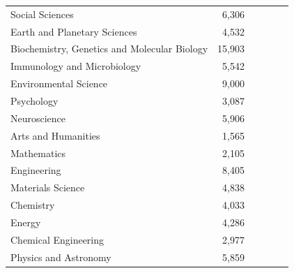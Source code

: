 \documentclass[a4paper,man,floatsintext,longtable,noextraspace,12pt]{apa6}
\begin{document}
\begin{table}[H]
{\begin{tabular}[t]{lrrrrr}
Social Sciences & 6,306 & \cellcolor[HTML]{F79273}{60} & \cellcolor[HTML]{F27F70}{36} & \cellcolor[HTML]{FFE8BB}{3} & \cellcolor[HTML]{FFFFFF}{0}\\
Earth and Planetary Sciences & 4,532 & \cellcolor[HTML]{F89874}{59} & \cellcolor[HTML]{F48671}{35} & \cellcolor[HTML]{FCD697}{5} & \cellcolor[HTML]{FFFFFF}{0}\\
Biochemistry, Genetics and Molecular Biology & 15,903 & \cellcolor[HTML]{F89874}{59} & \cellcolor[HTML]{F48671}{35} & \cellcolor[HTML]{FDE1A5}{4} & \cellcolor[HTML]{FAA476}{2}\\
Immunology and Microbiology & 5,542 & \cellcolor[HTML]{F89874}{59} & \cellcolor[HTML]{F58D72}{34} & \cellcolor[HTML]{FCC98E}{6} & \cellcolor[HTML]{FAA476}{2}\\
Environmental Science & 9,000 & \cellcolor[HTML]{F99D75}{58} & \cellcolor[HTML]{EF726E}{38} & \cellcolor[HTML]{FFE8BB}{3} & \cellcolor[HTML]{FCDE9C}{1}\\
Psychology & 3,087 & \cellcolor[HTML]{FAA376}{57} & \cellcolor[HTML]{EC686E}{40} & \cellcolor[HTML]{FFF0D2}{2} & \cellcolor[HTML]{FCDE9C}{1}\\
Neuroscience & 5,906 & \cellcolor[HTML]{FBAA7A}{56} & \cellcolor[HTML]{EC686E}{40} & \cellcolor[HTML]{FFE8BB}{3} & \cellcolor[HTML]{FCDE9C}{1}\\
Arts and Humanities & 1,565 & \cellcolor[HTML]{FCB882}{54} & \cellcolor[HTML]{E4536F}{44} & \cellcolor[HTML]{FFF7E8}{1} & \cellcolor[HTML]{FFFFFF}{0}\\
Mathematics & 2,105 & \cellcolor[HTML]{FCBF87}{53} & \cellcolor[HTML]{EF726E}{38} & \cellcolor[HTML]{FBAF7D}{8} & \cellcolor[HTML]{FFFFFF}{0}\\
Engineering & 8,405 & \cellcolor[HTML]{FCD395}{50} & \cellcolor[HTML]{E24C70}{46} & \cellcolor[HTML]{FFE8BB}{3} & \cellcolor[HTML]{FCDE9C}{1}\\
Materials Science & 4,838 & \cellcolor[HTML]{FCDA99}{49} & \cellcolor[HTML]{E14971}{47} & \cellcolor[HTML]{FDE1A5}{4} & \cellcolor[HTML]{FFFFFF}{0}\\
Chemistry & 4,033 & \cellcolor[HTML]{FCE0A1}{48} & \cellcolor[HTML]{E24C70}{46} & \cellcolor[HTML]{FCD697}{5} & \cellcolor[HTML]{FCDE9C}{1}\\
Energy & 4,286 & \cellcolor[HTML]{FEE7B8}{46} & \cellcolor[HTML]{DC3977}{52} & \cellcolor[HTML]{FFF7E8}{1} & \cellcolor[HTML]{FCDE9C}{1}\\
Chemical Engineering & 2,977 & \cellcolor[HTML]{FFEBC4}{45} & \cellcolor[HTML]{E14971}{47} & \cellcolor[HTML]{FCBC85}{7} & \cellcolor[HTML]{FCDE9C}{1}\\
Physics and Astronomy & 5,859 & \cellcolor[HTML]{FFFFFF}{40} & \cellcolor[HTML]{EF726E}{38} & \cellcolor[HTML]{DC3977}{22} & \cellcolor[HTML]{FFFFFF}{0}\\
\bottomrule
\end{tabular}}
\end{table}
\end{document}
